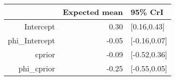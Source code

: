 \begin{tabular}{rrl}
  \hline
 & Expected mean & 95\% CrI \\ 
  \hline
Intercept & 0.30 & [0.16,0.43] \\ 
  phi\_Intercept & -0.05 & [-0.16,0.07] \\ 
  cprior & -0.09 & [-0.52,0.36] \\ 
  phi\_cprior & -0.25 & [-0.55,0.05] \\ 
   \hline
\end{tabular}


